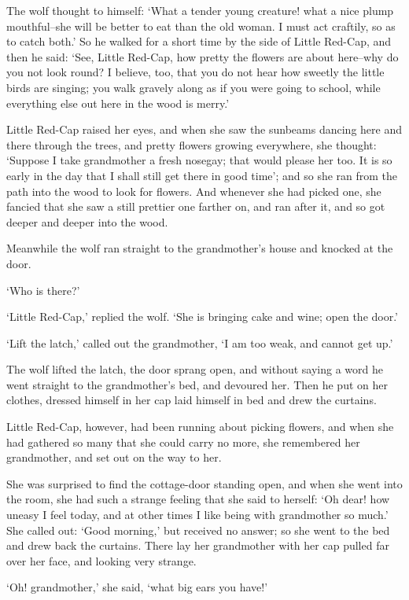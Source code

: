 The wolf thought to himself: `What a tender young creature! what a nice plump mouthful--she will be better to eat than the old woman. I must act craftily, so as to catch both.' So he walked for a short time by the side of Little Red-Cap, and then he said: `See, Little Red-Cap, how pretty the flowers are about here--why do you not look round? I believe, too, that you do not hear how sweetly the little birds are singing; you walk gravely along as if you were going to school, while everything else out here in the wood is merry.'

Little Red-Cap raised her eyes, and when she saw the sunbeams dancing here and there through the trees, and pretty flowers growing everywhere, she thought: `Suppose I take grandmother a fresh nosegay; that would please her too. It is so early in the day that I shall still get there in good time'; and so she ran from the path into the wood to look for flowers. And whenever she had picked one, she fancied that she saw a still prettier one farther on, and ran after it, and so got deeper and deeper into the wood.

Meanwhile the wolf ran straight to the grandmother's house and knocked at the door.

`Who is there?'

`Little Red-Cap,' replied the wolf. `She is bringing cake and wine; open the door.'

`Lift the latch,' called out the grandmother, `I am too weak, and cannot get up.'

The wolf lifted the latch, the door sprang open, and without saying a word he went straight to the grandmother's bed, and devoured her. Then he put on her clothes, dressed himself in her cap laid himself in bed and drew the curtains.

Little Red-Cap, however, had been running about picking flowers, and when she had gathered so many that she could carry no more, she remembered her grandmother, and set out on the way to her.

She was surprised to find the cottage-door standing open, and when she went into the room, she had such a strange feeling that she said to herself: `Oh dear! how uneasy I feel today, and at other times I like being with grandmother so much.' She called out: `Good morning,' but received no answer; so she went to the bed and drew back the curtains. There lay her grandmother with her cap pulled far over her face, and looking very strange.

`Oh! grandmother,' she said, `what big ears you have!'

